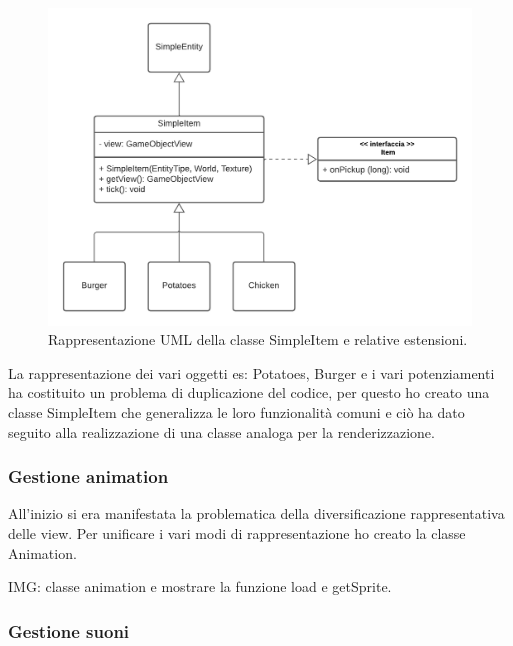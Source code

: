 \documentclass[a4paper,12pt]{report}
\begin{document}
\begin{figure}[H]
\centering{}
\includegraphics[scale=0.75] {img/simple-item.png}
\caption{Rappresentazione UML della classe SimpleItem e relative estensioni.}
\label{img:simple-item}
\end{figure}

La rappresentazione dei vari oggetti es: Potatoes, Burger e i  vari potenziamenti ha costituito un problema di duplicazione del codice, per questo ho creato una classe SimpleItem che generalizza le loro funzionalità comuni e ciò  ha dato seguito alla realizzazione di una classe analoga per la renderizzazione.

\subsubsection{Gestione animation}

All'inizio si era manifestata la problematica della diversificazione rappresentativa delle view. Per unificare i vari modi di rappresentazione ho creato la classe Animation.

IMG: classe animation e mostrare la funzione load e getSprite.

\subsubsection{Gestione suoni}
\end{document}
